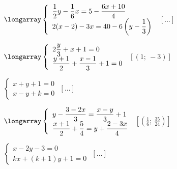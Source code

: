 \begin{esercizio}[\Ast]
\begin{multicols}{2}
\begin{enumeratea}
\item $\longarray\left\{\begin{array}{l}
\dfrac{1}{2}y-\dfrac{1}{6}x=5-\dfrac{6x+10}{4}\\
2(x-2)-3x=40-6\left(y-\dfrac{1}{3}\right)\end{array}\right.$
 \hfill $\left[...\right]$
\item $\longarray\left\{\begin{array}{l}
2\dfrac{y}{3}+x+1=0\\
\dfrac{y+1}{2}+\dfrac{x-1}{3}+1=0\end{array}\right.$
 \hfill $\left[(1;~-3)\right]$
  \item $\left\{\begin{array}{l}
  x+y+1=0 \\
  x-y+k=0 \end{array}\right.$
 \hfill $\left[...\right]$
\item $\longarray\left\{\begin{array}{l}
y-\dfrac{3-2x}{3}=\dfrac{x-y}{3}+1\\
\dfrac{x+1}{2}+\dfrac{5}{4}=y+\dfrac{2-3x}{4}\end{array}\right.$
 \hfill $\left[\left(\frac{1}{6};~\frac{35}{24}\right)\right]$
\item $\left\{\begin{array}{l}
x-2y-3=0\\
kx+(k+1)y+1=0 \end{array}\right.$
 \hfill $\left[...\right]$
 \end{enumeratea}
 \end{multicols}
\end{esercizio}


